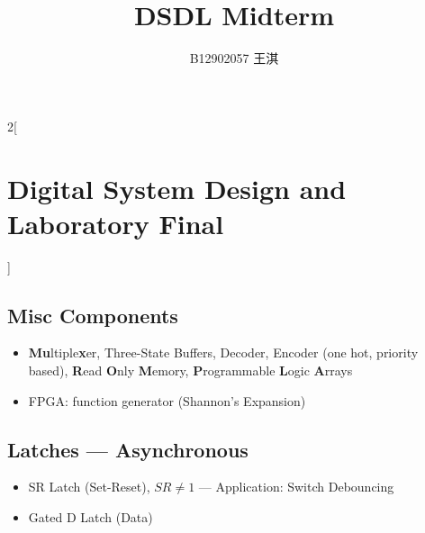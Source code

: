 \documentclass[10pt,a4paper,twoside]{article}
\title{DSDL \textbf{Midterm}}
\author{B12902057 王淇}
\date{}
\begin{document}
	  \begin{multicols}{2}[\section*{Digital System Design and Laboratory Final}]
		\subsection*{Misc Components}
		\begin{itemize}
			\item \textbf{Mu}ltiple\textbf{x}er, Three-State Buffers, Decoder, Encoder (one hot, priority based), \textbf Read \textbf Only \textbf Memory, \textbf Programmable \textbf Logic \textbf Arrays
			\item FPGA: function generator (Shannon's Expansion)
		\end{itemize}
		\subsection*{Latches --- Asynchronous}
		\begin{itemize}
			\item SR Latch (Set-Reset), $SR \neq 1$ --- Application: Switch Debouncing
			\item Gated D Latch (Data)
		\end{itemize}
		
		

\end{multicols}
\end{document}
